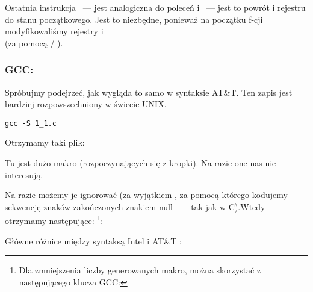 Ostatnia instrukcja \LEAVE~--- jest analogiczna do poleceń  i ~--- jest to powrót  i rejestru \EBP do stanu początkowego.
Jest to niezbędne, ponieważ na początku f-cji modyfikowaliśmy rejestry \ESP i \EBP{}\\
(za pomocą  / ).

\subsubsection{GCC: \ATTSyntax}
\label{ATT_syntax}

Spróbujmy podejrzeć, jak wygląda to samo w syntaksie AT\&T.
Ten zapis jest bardziej rozpowszechniony w świecie UNIX.

\begin{lstlisting}[caption=kompilujemy w GCC 4.7.3]
gcc -S 1_1.c
\end{lstlisting}

Otrzymamy taki plik:



Tu jest dużo makro (rozpoczynających się z kropki). Na razie one nas nie interesują.

Na razie możemy je ignorować (za wyjątkiem , za pomocą którego kodujemy sekwencję znaków zakończonych znakiem null ~--- tak jak w C).Wtedy otrzymamy następujące:
\footnote{Dla zmniejszenia liczby generowanych  makro, można skorzystać z następującego klucza GCC: }:



\myindex{\ATTSyntax}
\myindex{\IntelSyntax}
Główne różnice między syntaksą Intel i AT\&T :

